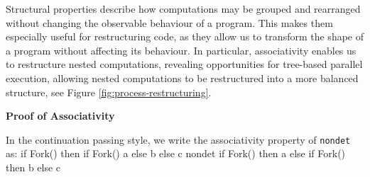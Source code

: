 \documentclass[logo,bsc,singlespacing,parskip]{infthesis}
\begin{document}
Structural properties describe how computations may be grouped and rearranged without changing the observable behaviour of a program. This makes them especially useful for restructuring code, as they allow us to transform the shape of a program without affecting its behaviour. In particular, associativity enables us to restructure nested computations, revealing opportunities for tree-based parallel execution, allowing nested computations to be restructured into a more balanced structure, see Figure  \ref{fig:process-restructuring}.



\vspace{1em}
\textbf{\large{Proof of Associativity}}

In the continuation passing style, we  write the associativity property of \lstinline{nondet} as:
{
if Fork() then
if Fork() 
a 
else 
b 
else 
c
}
{nondet}
{
if Fork() then a 
else 
if Fork() 
 then b 
 else c
}
\end{document}
